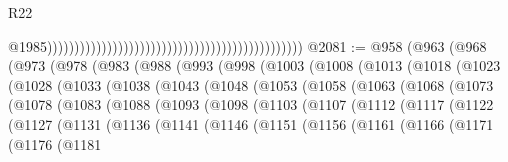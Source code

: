 \begin{lexlean}{R22}
\begin{coremodule}
                                                                                                  @1985)))))))))))))))))))))))))))))))))))))))))))))))
@2081 := @958
    (@963
      (@968
        (@973
          (@978
            (@983
              (@988
                (@993
                  (@998
                    (@1003
                      (@1008
                        (@1013
                          (@1018
                            (@1023
                              (@1028
                                (@1033
                                  (@1038
                                    (@1043
                                      (@1048
                                        (@1053
                                          (@1058
                                            (@1063
                                              (@1068
                                                (@1073
                                                  (@1078
                                                    (@1083
                                                      (@1088
                                                        (@1093
                                                          (@1098
                                                            (@1103
                                                              (@1107
                                                                (@1112
                                                                  (@1117
                                                                    (@1122
                                                                      (@1127
                                                                        (@1131
                                                                          (@1136
                                                                            (@1141
                                                                              (@1146
                                                                                (@1151
                                                                                  (@1156
                                                                                    (@1161
                                                                                      (@1166
                                                                                        (@1171
                                                                                          (@1176
                                                                                            (@1181

\end{coremodule}
\end{lexlean}
